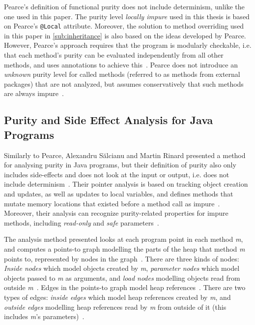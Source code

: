 \documentclass[a4paper,12pt]{article}
\begin{document}
Pearce's definition of functional purity does not include determinism, unlike the one used in this paper. The purity level \textit{locally impure} used in this thesis is based on Pearce's \texttt{@Local} attribute. Moreover, the solution to method overriding used in this paper in \autoref{sub:inheritance} is also based on the ideas developed by Pearce. However, Pearce's approach requires that the program is modularly checkable, i.e. that each method's purity can be evaluated independently from all other methods, and uses annotations to achieve this~\cite{pearce2011jpure}.  Pearce does not introduce an \textit{unknown} purity level for called methods (referred to as methods from external packages) that are not analyzed, but assumes conservatively that such methods are always impure~\cite{pearce2011jpure}.


\subsection{Purity and Side Effect Analysis for Java Programs} \label{sub:Purity and Side Effect Analysis for Java Programs}
Similarly to Pearce, Alexandru S\u{a}lcianu and Martin Rinard presented a method for analysing purity in Java programs, but their definition of purity also only includes side-effects and does not look at the input or output, i.e. does not include determinism~\cite{salcianu}. Their pointer analysis is based on tracking object creation and updates, as well as updates to local variables, and defines methods that mutate memory locations that existed before a method call as impure~\cite{salcianu}. Moreover, their analysis can recognize purity-related properties for impure methods, including \textit{read-only} and \textit{safe} parameters~\cite{salcianu}.

The analysis method presented looks at each program point in each method \textit{m}, and computes a points-to graph modelling the parts of the heap that method \textit{m} points to, represented by nodes in the graph~\cite{salcianu}. There are three kinds of nodes: \textit{Inside nodes} which model objects created by \textit{m}, \textit{parameter nodes} which model objects passed to \textit{m} as arguments, and \textit{load nodes} modelling objects read from outside \textit{m}~\cite{salcianu}. Edges in the points-to graph model heap references~\cite{salcianu}. There are two types of edges: \textit{inside edges} which model heap references created by \textit{m}, and \textit{outside edges} modelling heap references read by \textit{m} from outside of it (this includes \textit{m}'s parameters)~\cite{salcianu}.
\end{document}
